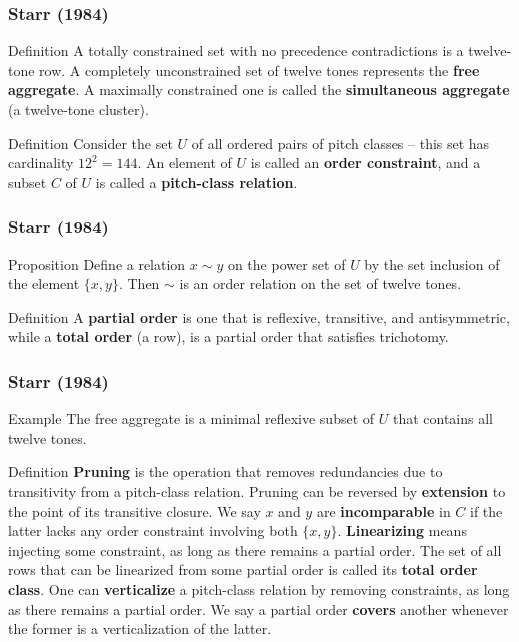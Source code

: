 
\begin{frame}
	\frametitle{Starr (1984)}
	\begin{block}{Definition}
		A totally constrained set with no precedence contradictions is a twelve-tone row. A completely unconstrained set of twelve tones represents the \textbf{free aggregate}. A maximally constrained one is called the \textbf{simultaneous aggregate} (a twelve-tone cluster).
	\end{block}
	\begin{block}{Definition}
		Consider the set $U$ of all ordered pairs of pitch classes -- this set has cardinality $12^2 = 144$. An element of $U$ is called an \textbf{order constraint}, and a subset $C$ of $U$ is called a \textbf{pitch-class relation}.
	\end{block}
\end{frame}

\begin{frame}
	\frametitle{Starr (1984)}
	\begin{block}{Proposition}
		Define a relation $x \sim y$ on the power set of $U$ by the set inclusion of the element $\{ x, y \}$. Then $\sim$ is an order relation on the set of twelve tones.
	\end{block}
	\begin{block}{Definition}
		A \textbf{partial order} is one that is reflexive, transitive, and antisymmetric, while a \textbf{total order} (a row), is a partial order that satisfies trichotomy.
	\end{block}
\end{frame}

\begin{frame}
	\frametitle{Starr (1984)}
	\begin{block}{Example}
		The free aggregate is a minimal reflexive subset of $U$ that contains all twelve tones.
	\end{block}
	\begin{block}{Definition}
		\textbf{Pruning} is the operation that removes redundancies due to transitivity from a pitch-class relation. Pruning can be reversed by \textbf{extension} to the point of its transitive closure. We say $x$ and $y$ are \textbf{incomparable} in $C$ if the latter lacks any order constraint involving both $\{ x, y \}$. \textbf{Linearizing} means injecting some constraint, as long as there remains a partial order. The set of all rows that can be linearized from some partial order is called its \textbf{total order class}. One can \textbf{verticalize} a pitch-class relation by removing constraints, as long as there remains a partial order. We say a partial order \textbf{covers} another whenever the former is a verticalization of the latter.
	\end{block}
\end{frame}

